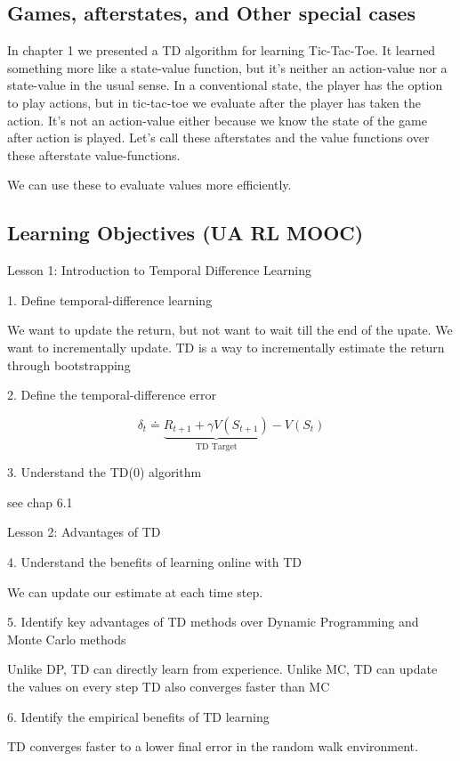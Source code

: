 \documentclass[sutton_barto_notes.tex]{subfiles}
\begin{document}
\subsection{Games, afterstates, and Other special cases}

In chapter 1 we presented a TD algorithm for learning Tic-Tac-Toe. It learned something more like a state-value function, but it's neither an action-value nor a state-value in the usual sense. In a conventional state, the player has the option to play actions, but in tic-tac-toe we evaluate after the player has taken the action. It's not an action-value either because we know the state of the game after action is played. Let's call these afterstates and the value functions over these afterstate value-functions.

We can use these to evaluate values more efficiently.

\subsection{Learning Objectives (UA RL MOOC)}

Lesson 1: Introduction to Temporal Difference Learning

1. Define temporal-difference learning

We want to update the return, but not want to wait till the end of the upate. We want to incrementally update. TD is a way to incrementally estimate the return through bootstrapping

2. Define the temporal-difference error

$$\delta_t \doteq \underbrace{R_{t+1} + \gamma V(S_{t+1})}_\text{TD Target} - V(S_t)$$

3. Understand the TD(0) algorithm

see chap 6.1

Lesson 2: Advantages of TD

4. Understand the benefits of learning online with TD

We can update our estimate at each time step.

5. Identify key advantages of TD methods over Dynamic Programming and Monte Carlo methods

Unlike DP, TD can directly learn from experience. Unlike MC, TD can update the values on every step TD also converges faster than MC

6. Identify the empirical benefits of TD learning

TD converges faster to a lower final error in the random walk environment.
\end{document}
